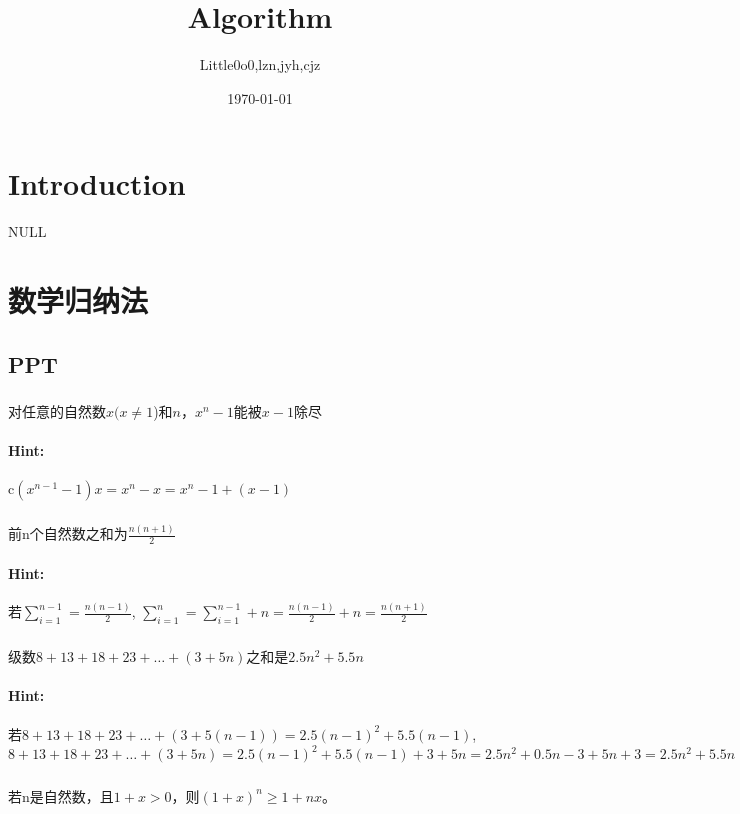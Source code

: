 \documentclass{article}
\title{Algorithm}
\author{Little0o0,lzn,jyh,cjz}
\date{\today}
\begin{document}
 


\maketitle

\section{Introduction}
    NULL

\section{数学归纳法} 
\subsection{PPT}
    \subsubsection{}对任意的自然数$x(x \ne 1$)和$n$，$x^{n}
-1$能被$x-1$除尽
    \paragraph{Hint:} c$(x^{n-1}-1)x = x^{n} - x = x^{n} - 1 + (x - 1) $

    \subsubsection{}前n个自然数之和为$\frac{n(n+1)}{2}$
    \paragraph{Hint:} 若$\sum_{i=1}^{n-1} = \frac{n(n-1)}{2}$, $\sum_{i=1}^{n} =\sum_{i=1}^{n-1} + n = \frac{n(n-1)}{2} + n = \frac{n(n+1)}{2}$
    
    \subsubsection{}级数$8+13+18+23+…+(3+5n)$之和是$2.5n^{2}+5.5n$
    \paragraph{Hint:} 若$8+13+18+23+…+(3+5(n-1)) = 2.5(n-1)^{2}+5.5(n-1)$,$8+13+18+23+…+(3+5n) = 2.5(n-1)^{2}+5.5(n-1) + 3+5n = 2.5n^{2}+ 0.5n -3 + 5n +3 = 2.5n^{2}+5.5n $
    
    \subsubsection{}若n是自然数，且$1+x>0$，则$(1+x)^{n}\geq 1+nx $。
\end{document}

